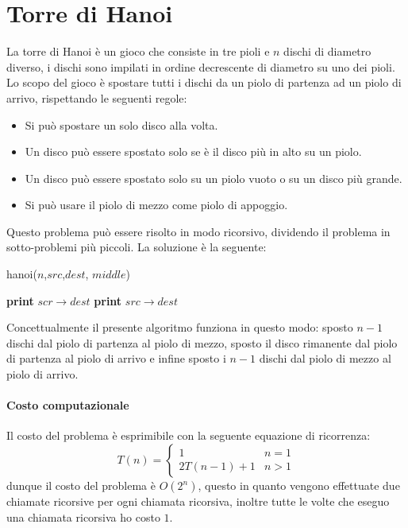 \section{Torre di Hanoi}
    La torre di Hanoi è un gioco che consiste in tre pioli e $n$ dischi di diametro diverso, i dischi sono impilati in ordine decrescente di diametro su uno dei pioli. Lo scopo del gioco è spostare tutti i dischi da un piolo di partenza ad un piolo di arrivo, rispettando le seguenti regole:
    \begin{itemize}
        \item Si può spostare un solo disco alla volta.
        \item Un disco può essere spostato solo se è il disco più in alto su un piolo.
        \item Un disco può essere spostato solo su un piolo vuoto o su un disco più grande.
        \item Si può usare il piolo di mezzo come piolo di appoggio.
    \end{itemize}
    Questo problema può essere risolto in modo ricorsivo, dividendo il problema in sotto-problemi più piccoli. La soluzione è la seguente:

    \begin{algorithm}[H]
        \caption{hanoi(\Int $n$,\Int $src$,\Int $dest$, \Int $middle$)}
        \begin{algorithmic}
                \State \textbf{print} $scr \rightarrow dest$
            \Else
                \State {}
                \State \textbf{print} $src \rightarrow dest$
                \State {}
            \EndIf
        \end{algorithmic}
    \end{algorithm}
    
    Concettualmente il presente algoritmo funziona in questo modo: sposto $n-1$ dischi dal piolo di partenza al piolo di mezzo, sposto il disco rimanente dal piolo di partenza al piolo di arrivo e infine sposto i $n-1$ dischi dal piolo di mezzo al piolo di arrivo.
    \paragraph{Costo computazionale} Il costo del problema è esprimibile con la seguente equazione di ricorrenza:
    \[
        T(n)=\begin{cases}
            1 & n = 1\\
            2T(n-1) + 1 &  n > 1
        \end{cases}
    \]
    dunque il costo del problema è $O(2^n)$, questo in quanto vengono effettuate due chiamate ricorsive per ogni chiamata ricorsiva, inoltre tutte le volte che eseguo una chiamata ricorsiva ho costo $1$.
